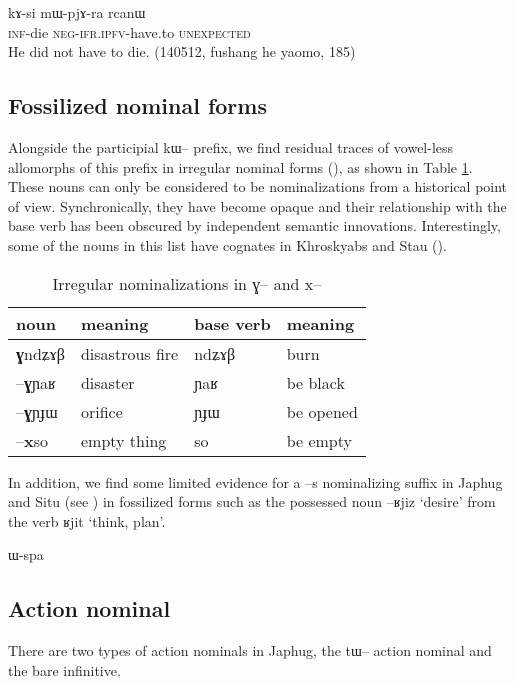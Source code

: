 \documentclass[oldfontcommands,oneside,a4paper,11pt]{article}
\newcommand{\ipa}[1]{{\phon #1}} %
\begin{document}
\begin{exe}
\ex \label{ex:kAsi}
\gll
\ipa{kɤ-si} \ipa{mɯ-pjɤ-ra} \ipa{rcanɯ} \\
\textsc{inf}-die \textsc{neg-ifr.ipfv}-have.to \textsc{unexpected} \\
\glt He did not have to die. (140512, fushang he yaomo, 185)
\end{exe} 


\subsection{Fossilized nominal forms}
Alongside the participial \ipa{kɯ--} prefix, we find residual traces of vowel-less allomorphs of this prefix in irregular nominal forms (\citealt[5]{jacques14antipassive}), as shown in Table \ref{tab:irr.nmlz}. These nouns can only be considered to be nominalizations from a historical point of view. Synchronically, they have become opaque and their relationship with the base verb has been obscured by independent semantic innovations. Interestingly, some of the nouns in this list have cognates in Khroskyabs and Stau (\citealt{lai13affixale}).

\begin{table}[H]
\caption{Irregular nominalizations in \ipa{ɣ}-- and \ipa{x}--} \label{tab:irr.nmlz} \centering
\begin{tabular}{llll}
\toprule
 noun & meaning &base verb & meaning\\
\midrule
\ipa{\textbf{ɣ}ndʑɤβ} & disastrous fire & \ipa{ndʑɤβ} & burn \\
\ipa{--\textbf{ɣ}ɲaʁ}   &disaster& \ipa{ɲaʁ} & be black \\
\ipa{--\textbf{ɣ}ɲɟɯ}   & orifice & \ipa{ɲɟɯ} & be opened \\
\ipa{--\textbf{x}so}   &  empty thing &\ipa{so} & be empty \\
\bottomrule
\end{tabular}
\end{table}

In addition, we find some limited evidence for a \ipa{--s} nominalizing suffix in Japhug and Situ (see \citealt{jacques03s.houzhui}) in fossilized forms such as the possessed noun \ipa{--ʁjiz} `desire' from the verb \ipa{ʁjit} `think, plan'.


\ipa{ɯ-spa}


\subsection{Action nominal}
There are two types of action nominals in Japhug, the \ipa{tɯ--} action nominal and the bare infinitive.
\end{document}
